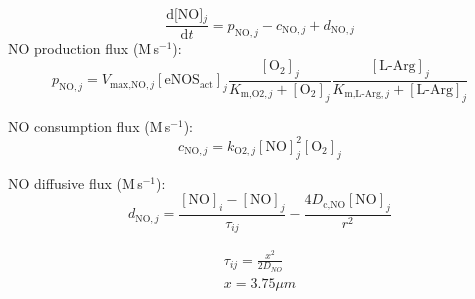 \documentclass[fleqn]{report}
\numberwithin{equation}{section}
\numberwithin{equation}{section}
\newcommand{\NO}{\text{NO}}
\newcommand{\eNOSact}{\text{eNOS$_{\text{act}}$}}
\newcommand{\LArg}{\text{L-Arg}}
\newcommand{\Otwo}{\text{O$_2$}}
\newcommand{\NOj}{\text{[NO]$_j$}}
\newcommand{\uMpers}{\textmu M\,s$^{-1}$}
\newcommand\pNO[1]{\text{$p_{\text{NO},#1}$}}
\newcommand\cNO[1]{\text{$c_{\text{NO},#1}$}}
\newcommand\dNO[1]{\text{$d_{\text{NO},#1}$}}
\begin{document}
				\begin{equation} 
					\dfrac{\mathrm{d}\NOj}{\mathrm{d}t} = \pNO{j} - \cNO{j} + \dNO{j} 
				\end{equation}
				NO production flux (\uMpers):
				\begin{equation} 
					\pNO{j} = V_{\text{max,NO},j} [\eNOSact]_j  \frac{[\Otwo]_j}{K_{\text{m,O2},j}+[\Otwo]_j} \frac{[\LArg]_j}{K_{\text{m,L-Arg},j}+[\LArg]_j}
				\end{equation}	
				
				NO consumption flux (\uMpers):
				\begin{equation} 
					\cNO{j} = k_{\text{O2},j} [\NO]_j^2 [\Otwo]_j 
				\end{equation}	
				
				NO diffusive flux (\uMpers):					
				\begin{equation} 
					\dNO{j} = \frac{[\NO]_i - [\NO]_j}{\tau_{ij}} - \frac{4 D_{\text{c,NO}}[\NO]_j}{r^2}
				\end{equation}	

							\begin{eqnarray}
							\tau_{ij}=\frac{x^2}{2D_{NO}}\\
							x=3.75 \mu m
							\end{eqnarray}
\end{document}
